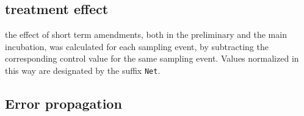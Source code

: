     \subsection{treatment effect}
        the effect of short term amendments, both in the preliminary and the main incubation, was calculated for each sampling event, by subtracting the corresponding control value for the same sampling event. Values normalized in this way are designated by the suffix \texttt{Net}.






    \vspace{2cm}


    \subsection{Error propagation}

